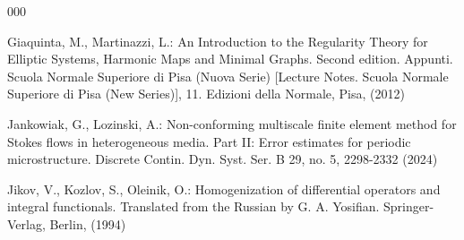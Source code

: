 \documentclass[13pt,CJK]{article}
\theoremstyle{plain}                       %
\theoremstyle{remark}
\numberwithin{equation}{section}
\begin{document}
\begin{thebibliography}{000}

Giaquinta, M.,  Martinazzi, L.:
An Introduction to the Regularity Theory
for Elliptic Systems, Harmonic Maps and Minimal Graphs. Second edition. Appunti.
Scuola Normale Superiore di Pisa (Nuova Serie)
[Lecture Notes. Scuola Normale Superiore di Pisa (New Series)],
11. Edizioni della Normale, Pisa,
(2012)






Jankowiak, G., Lozinski, A.: Non-conforming multiscale finite element method for Stokes flows in heterogeneous media. Part II: Error estimates for periodic microstructure. Discrete Contin. Dyn. Syst. Ser. B 29, no. 5, 2298-2332 (2024)


Jikov, V., Kozlov, S.,  Oleinik, O.:
 Homogenization of differential operators and integral functionals. Translated from the Russian by G. A. Yosifian. Springer-Verlag, Berlin, (1994)



\end{thebibliography}
\end{document}
